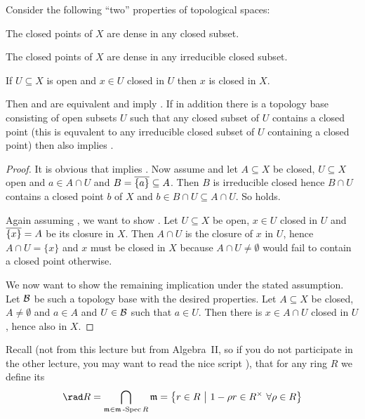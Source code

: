 \documentclass[a4paper,parskip=half,numbers=enddot, DIV=12]{scrreprt}
\begin{document}
\begin{fact}
    Consider the following ``two'' properties of topological spaces:
    \begin{alphanumerate}
    \item 
        The closed points of $X$ are dense in any closed subset.
    \item 
        The closed points of $X$ are dense in any irreducible closed subset.
    \item   
        If $U\subseteq X$ is open and $x\in U$ closed in $U$ then $x$ is closed in $X$.
    \end{alphanumerate}
    Then  and  are equivalent and imply . If in addition there is a topology base consisting of open subsets $U$ such that any closed subset of $U$ contains a closed point (this is equvalent to any irreducible closed subset of $U$ containing a closed point) then  also implies .
\end{fact}
\begin{proof}
    It is obvious that  implies . Now assume  and let $A\subseteq X$ be closed, $U\subseteq X$ open and $a\in A\cap U$ and $B= \overline{\{a\}} \subseteq A$. Then $B$ is irreducible closed hence $B\cap U$ contains a closed point $b$ of $X$ and $b\in B\cap U\subseteq A\cap U$. So  holds.
    
    Again assuming , we want to show . Let $U\subseteq X$ be open, $x\in U$ closed in $U$ and $\overline{\{x\}}= A$ be its closure in $X$. Then $A\cap U$ is the closure of $x$ in $U$, hence $A\cap U = \{x\}$ and $x$ must be closed in $X$ because $A\cap U\neq \emptyset$ would fail to contain a closed point otherwise.
    
    We now want to show the remaining implication under the stated assumption. Let $\mathcal{B}$ be such a topology base with the desired properties. Let $A\subseteq X$ be closed, $A\neq \emptyset $ and $a\in A$ and $U\in \mathcal{B}$ such that $a\in U$. Then there is $x\in A\cap U$ closed in $U$, hence also in $X$. 
\end{proof}

Recall (not from this lecture but from Algebra~II, so if you do not participate in the other lecture, you may want to read the nice script \cite{alg2}), that for any ring $R$ we define its  
\begin{align*}
    \rad R = \bigcap_{\mm\in\mSpec R} \mm = \left\{r\in R\st 1-\rho r \in R^\times\ \forall \rho\in R\right\}
\end{align*}
\end{document}

